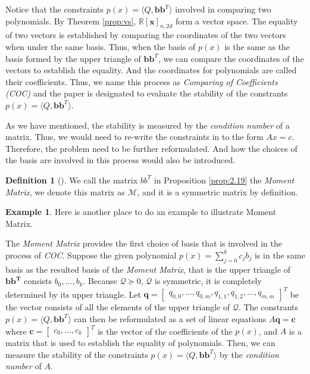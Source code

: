 \documentclass[12pt]{amsart}
\numberwithin{equation}{section}
\theoremstyle{definition}
\newtheorem{definition}[thm]{Definition}
\newtheorem{example}[thm]{Example}
\numberwithin{thm}{section}
\begin{document}
Notice that the constraints $p(x) = \langle Q, \mathbf{bb}^T \rangle$ involved in comparing two polynomials. 
By Theorem \ref{prop:vs}, $\mathbb{R}[\mathbf{x}]_{n, 2d}$ form a vector space. 
The equality of two vectors is established by comparing the coordinates of the two vectors when under the same basis. 
Thus, when the basis of $p(x)$ is the same as the basis formed by the upper triangle of $\mathbf{bb}^T$, we can compare the 
coordinates of the vectors to establish the equality. And the coordinates for polynomials are called their coefficients. 
Thus, we name this process as \emph{Comparing of Coefficients (COC)} and the paper is designated to evaluate the stability of the constrants $p(x) = \langle Q, \mathbf{bb}^T \rangle$.

As we have mentioned, the stability is measured by the \emph{condition number} of a matrix. Thus, we would need to re-write the constraints in to the form $A x = c$. 
Therefore, the problem need to be further reformulated. And how the choices of the basis are involved in this process would also be introduced.

\begin{definition}[\cite{Recher:Masterthesis}]
     We call the matrix $bb^T$ in Proposition \ref{prop:2.19} the \emph{Moment Matrix}, we denote this matrix as $\mathcal{M}$, and it is a symmetric matrix by definition.
\end{definition}

\begin{example}
     Here is another place to do an example to illustrate Moment Matrix.
\end{example}

\smallskip
The \emph{Moment Matrix} provides the first choice of basis that is involved in the process of \emph{COC}. 
Suppose the given polynomial $p(x) = \sum_{j = 0} ^ k c_j b_j$ 
is in the same basis as the resulted basis of the \emph{Moment Matrix}, 
that is the upper triangle of $\mathbf{bb^T}$ consists $b_0, ..., b_k$. 
Because $\mathcal{Q} \succcurlyeq 0$, $\mathcal{Q}$ is symmetric, 
it is completely determined by its upper triangle.
Let $\mathbf{q} = \begin{bmatrix} q_{0,0}, ..., q_{0, m}, q_{1,1}, q_{1, 2}, ..., q_{m, m} \end{bmatrix}^T$ 
be the vector consists of all the elements of the upper triangle of $\mathcal{Q}$.
The constrants $p(x) = \langle Q, \mathbf{bb}^T \rangle$ can then be reformulated as a set of linear equations 
$A \mathbf{q} = \mathbf{c}$ where $ \mathbf{c} = \begin{bmatrix}
     c_0, ..., c_k
\end{bmatrix}^T$ 
is the vector of the coefficients of the $p(x)$, 
and $A$ is a matrix that is used to establish the equality of polynomials. 
Then, we can measure the stability of the constraints $p(x) = \langle Q, \mathbf{bb}^T \rangle$ by the \emph{condition number} of $A$. 
\end{document}
